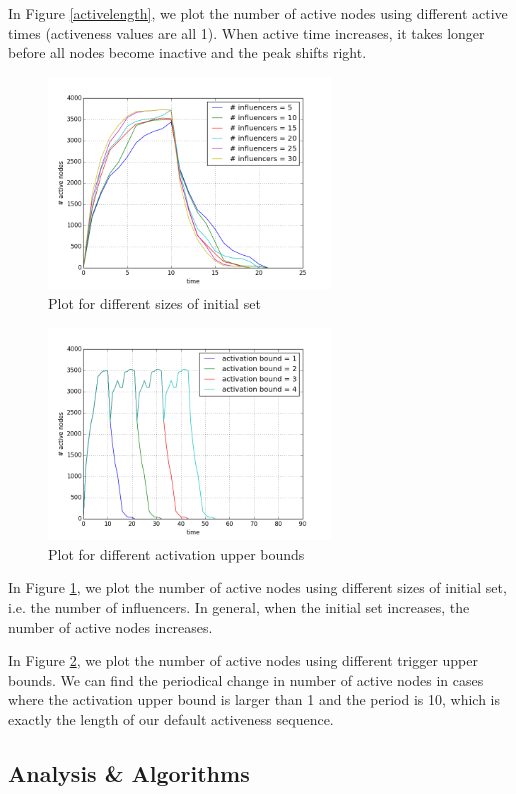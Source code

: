 \documentclass{article}
\begin{document}
In Figure \ref{activelength}, we plot the number of active nodes using different active times (activeness values are all 1). When active time increases, it takes longer before all nodes become inactive and the peak shifts right.

\begin{figure}[!htbp]
\centering
\includegraphics[width=7.5cm]{yzplot3.png}
\caption{Plot for different sizes of initial set}
\label{size}
\end{figure}

\begin{figure}[!htbp]
\centering
\includegraphics[width=7.5cm]{yzplot4.png}
\caption{Plot for different activation upper bounds}
\label{trigger}
\end{figure}

In Figure \ref{size}, we plot the number of active nodes using different sizes of initial set, i.e. the number of influencers. In general, when the initial set increases, the number of active nodes increases.

In Figure \ref{trigger}, we plot the number of active nodes using different trigger upper bounds. We can find the periodical change in number of active nodes in cases where the activation upper bound is larger than 1 and the period is 10, which is exactly the length of our default activeness sequence.

\subsection{Analysis \& Algorithms}
\end{document}
